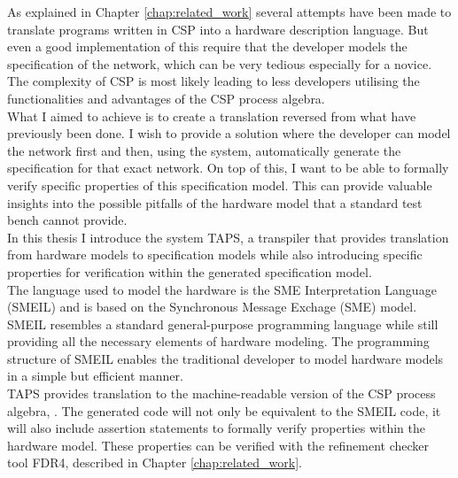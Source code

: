%



As explained in Chapter \ref{chap:related_work} several attempts have been made to translate programs written in CSP into a hardware description language. But even a good implementation of this require that the developer models the specification of the \cspm{} network, which can be very tedious especially for a novice.
The complexity of CSP is most likely leading to less developers utilising the functionalities and advantages of the CSP process algebra.\\

What I aimed to achieve is to create a translation reversed from what have previously been done. I wish to provide a solution where the developer can model the network first and then, using the system, automatically generate the specification for that exact network. On top of this, I want to be able to formally verify specific properties of this specification model. This can provide valuable insights into the possible pitfalls of the hardware model that a standard test bench cannot provide.\\

In this thesis I introduce the system TAPS, a transpiler that provides translation from hardware models to specification models while also introducing specific properties for verification within the generated specification model.\\

The language used to model the hardware is the SME Interpretation Language (SMEIL) and is based on the Synchronous Message Exchage (SME) model. SMEIL resembles a standard general-purpose programming language while still providing all the necessary elements of hardware modeling. The programming structure of SMEIL enables the traditional developer to model hardware models in a simple but efficient manner.\\

TAPS provides translation to the machine-readable version of the CSP process algebra, \cspm{}. The generated \cspm{} code will not only be equivalent to the SMEIL code, it will also include assertion statements to formally verify properties within the hardware model. These properties can be verified with the \cspm{} refinement checker tool FDR4, described in Chapter \ref{chap:related_work}.



